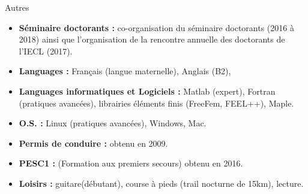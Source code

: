 \documentclass[10pt,a4paper]{report}
\begin{document}
\vspace{0.5cm}
\noindent
{\selectfont
\begin{Large}
Autres
\end{Large}
\hrulefill
}
\vspace{.5cm}

\noindent
\begin{itemize}
\item \textbf{Séminaire doctorants :} co-organisation du séminaire doctorants (2016 à 2018) ainsi que l'organisation de la rencontre annuelle des doctorants de l'IECL (2017).
\item \textbf{Languages :} Français (langue maternelle), Anglais (B2),
\item \textbf{Languages informatiques et Logiciels :} Matlab (expert), Fortran (pratiques avancées), librairies éléments finis (FreeFem, FEEL++), Maple.
\item \textbf{O.S. :} Linux (pratiques avancées), Windows, Mac.
\item \textbf{Permis de conduire :} obtenu en 2009.
\item \textbf{PESC1 :} (Formation aux premiers secours) obtenu en 2016.
\item \textbf{Loisirs :} guitare(débutant), course à pieds (trail nocturne de 15km), lecture.
\end{itemize}
\end{document}
